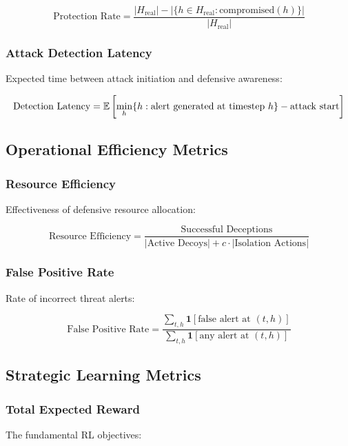 \documentclass[11pt]{article}
\theoremstyle{definition}
\theoremstyle{plain}
\begin{document}
\begin{equation}
\text{Protection Rate} = \frac{|H_{\text{real}}| - |\{h \in H_{\text{real}} : \text{compromised}(h)\}|}{|H_{\text{real}}|}
\end{equation}

\subsubsection{Attack Detection Latency}
Expected time between attack initiation and defensive awareness:

\begin{equation}
\text{Detection Latency} = \mathbb{E}\left[\min_h \{h : \text{alert generated at timestep } h\} - \text{attack start}\right]
\end{equation}

\subsection{Operational Efficiency Metrics}

\subsubsection{Resource Efficiency}
Effectiveness of defensive resource allocation:

\begin{equation}
\text{Resource Efficiency} = \frac{\text{Successful Deceptions}}{|\text{Active Decoys}| + c \cdot |\text{Isolation Actions}|}
\end{equation}

\subsubsection{False Positive Rate}
Rate of incorrect threat alerts:

\begin{equation}
\text{False Positive Rate} = \frac{\sum_{t,h} \mathbf{1}[\text{false alert at } (t,h)]}{\sum_{t,h} \mathbf{1}[\text{any alert at } (t,h)]}
\end{equation}

\subsection{Strategic Learning Metrics}

\subsubsection{Total Expected Reward}
The fundamental RL objectives:
\end{document}
